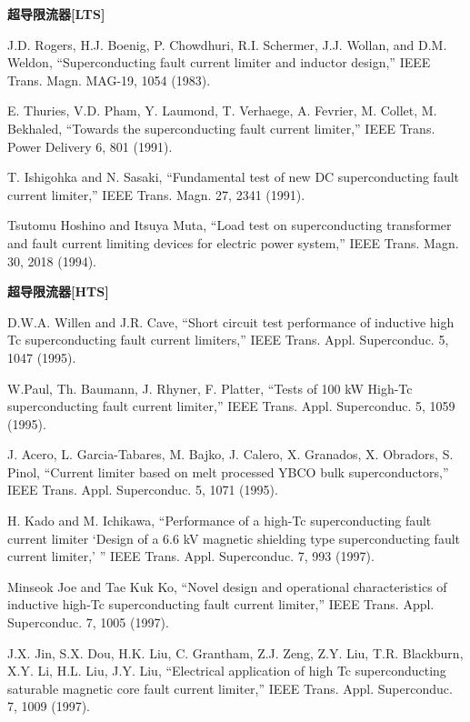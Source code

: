 \noindent \textbf{超导限流器[LTS] }

\noindent [9.112] J.D. Rogers, H.J. Boenig, P. Chowdhuri, R.I. Schermer, J.J. Wollan, and D.M.
Weldon, ``Superconducting fault current limiter and inductor design,” IEEE
Trans. Magn. MAG-19, 1054 (1983).

\noindent [9.113] E. Thuries, V.D. Pham, Y. Laumond, T. Verhaege, A. Fevrier, M. Collet, M.
Bekhaled, ``Towards the superconducting fault current limiter,” IEEE Trans.
Power Delivery 6, 801 (1991).

\noindent [9.114] T. Ishigohka and N. Sasaki, ``Fundamental test of new DC superconducting fault
current limiter,” IEEE Trans. Magn. 27, 2341 (1991).

\noindent [9.115] Tsutomu Hoshino and Itsuya Muta, ``Load test on superconducting transformer
and fault current limiting devices for electric power system,” IEEE Trans. Magn.
30, 2018 (1994).

\noindent \textbf{超导限流器[HTS] }

\noindent [9.116] D.W.A. Willen and J.R. Cave, ``Short circuit test performance of inductive high
Tc superconducting fault current limiters,” IEEE Trans. Appl. Superconduc. 5,
1047 (1995).

\noindent [9.117] W.Paul, Th. Baumann, J. Rhyner, F. Platter, ``Tests of 100 kW High-Tc superconducting
fault current limiter,” IEEE Trans. Appl. Superconduc. 5, 1059 (1995).

\noindent [9.118] J. Acero, L. Garcia-Tabares, M. Bajko, J. Calero, X. Granados, X. Obradors,
S. Pinol, ``Current limiter based on melt processed YBCO bulk superconductors,”
IEEE Trans. Appl. Superconduc. 5, 1071 (1995).

\noindent [9.119] H. Kado and M. Ichikawa, ``Performance of a high-Tc superconducting fault current
limiter ‘Design of a 6.6 kV magnetic shielding type superconducting fault
current limiter,’ ” IEEE Trans. Appl. Superconduc. 7, 993 (1997).

\noindent [9.120] Minseok Joe and Tae Kuk Ko, ``Novel design and operational characteristics of
inductive high-Tc superconducting fault current limiter,” IEEE Trans. Appl. Superconduc.
7, 1005 (1997).

\noindent [9.121] J.X. Jin, S.X. Dou, H.K. Liu, C. Grantham, Z.J. Zeng, Z.Y. Liu, T.R. Blackburn,
X.Y. Li, H.L. Liu, J.Y. Liu, ``Electrical application of high Tc superconducting
saturable magnetic core fault current limiter,” IEEE Trans. Appl. Superconduc.
7, 1009 (1997).

